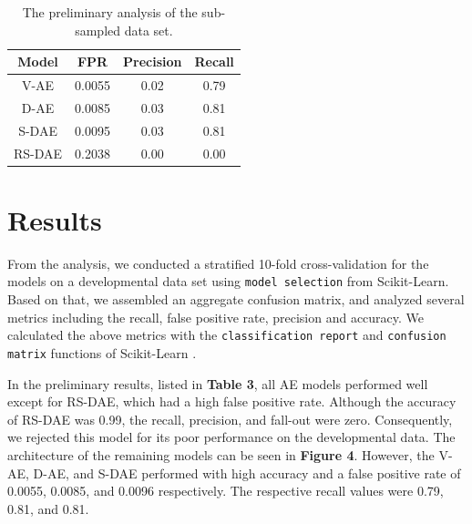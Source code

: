 \documentclass[sigconf]{acmart}
\begin{document}


\begin{table}[t]
  \centering
  \begin{tabular}{|c|c|c|c|}
  \hline
  \textrm{Model}  & \textrm{FPR} & \textrm{Precision} & \textrm{Recall} \\
  \hline
  \textrm{V-AE}   & 0.0055       & 0.02               & 0.79            \\
  \hline
  \textrm{D-AE}   & 0.0085       & 0.03               & 0.81            \\
  \hline
  \textrm{S-DAE}  & 0.0095       & 0.03               & 0.81            \\
  \hline
  \textrm{RS-DAE} & 0.2038       & 0.00               & 0.00            \\
  \hline
  \end{tabular}
  \caption{The preliminary analysis of the sub-sampled data set.}
  \label{tab:3}
\end{table}

\section{Results}

From the analysis, we conducted a stratified 10-fold cross-validation for the models on a developmental data set using \texttt{model selection} from Scikit-Learn.  Based on that, we assembled an aggregate confusion matrix, and analyzed several metrics including the recall, false positive rate, precision and accuracy.  We calculated the above metrics with the \texttt{classification report} and \texttt{confusion matrix} functions of Scikit-Learn \cite{PEDREGOSA}. 

In the preliminary results, listed in \textbf{Table 3}, all AE models performed well except for RS-DAE, which had a high false positive rate.  Although the accuracy of RS-DAE was 0.99, the recall, precision, and fall-out were zero. Consequently, we rejected this model for its poor performance on the developmental data. The architecture of the remaining models can be seen in \textbf{Figure 4}. However, the V-AE, D-AE, and S-DAE performed with high accuracy and a false positive rate of 0.0055, 0.0085, and 0.0096 respectively. The respective recall values were 0.79, 0.81, and 0.81.%
\end{document}

